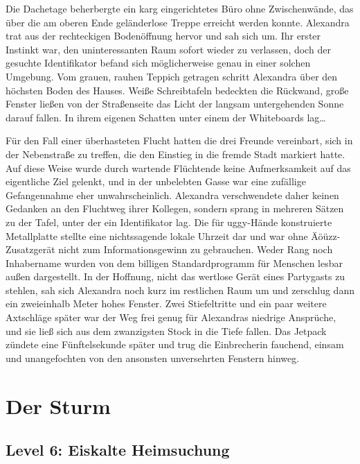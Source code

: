 Die Dachetage beherbergte ein karg eingerichtetes Büro ohne Zwischenwände, das über die am oberen Ende geländerlose Treppe erreicht werden konnte. Alexandra trat aus der rechteckigen Bodenöffnung hervor und sah sich um. Ihr erster Instinkt war, den uninteressanten Raum sofort wieder zu verlassen, doch der gesuchte Identifikator befand sich möglicherweise genau in einer solchen Umgebung. Vom grauen, rauhen Teppich getragen schritt Alexandra über den höchsten Boden des Hauses. Weiße Schreibtafeln bedeckten die Rückwand, große Fenster ließen von der Straßenseite das Licht der langsam untergehenden Sonne darauf fallen. In ihrem eigenen Schatten unter einem der Whiteboards lag…


Für den Fall einer überhasteten Flucht hatten die drei Freunde vereinbart, sich in der Nebenstraße zu treffen, die den Einstieg in die fremde Stadt markiert hatte. Auf diese Weise wurde durch wartende Flüchtende keine Aufmerksamkeit auf das eigentliche Ziel gelenkt, und in der unbelebten Gasse war eine zufällige Gefangennahme eher unwahrscheinlich. Alexandra verschwendete daher keinen Gedanken an den Fluchtweg ihrer Kollegen, sondern sprang in mehreren Sätzen zu der Tafel, unter der ein Identifikator lag. Die für uggy-Hände konstruierte Metallplatte stellte eine nichtssagende lokale Uhrzeit dar und war ohne Äöüzz-Zusatzgerät nicht zum Informationsgewinn zu gebrauchen. Weder Rang noch Inhabername wurden von dem billigen Standardprogramm für Menschen lesbar außen dargestellt. In der Hoffnung, nicht das wertlose Gerät eines Partygasts zu stehlen, sah sich Alexandra noch kurz im restlichen Raum um und zerschlug dann ein zweieinhalb Meter hohes Fenster. Zwei Stiefeltritte und ein paar weitere Axtschläge später war der Weg frei genug für Alexandras niedrige Ansprüche, und sie ließ sich aus dem zwanzigsten Stock in die Tiefe fallen. Das Jetpack zündete eine Fünftelsekunde später und trug die Einbrecherin fauchend, einsam und unangefochten von den ansonsten unversehrten Fenstern hinweg.


\chapter{Der Sturm}

\section{Level 6: Eiskalte Heimsuchung}

